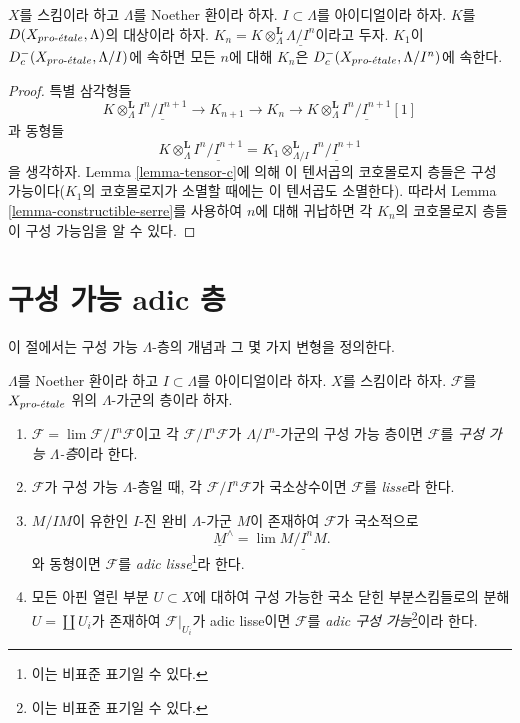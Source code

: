 \begin{lemma}
\label{lemma-compare-truncations-constructible}
$X$를 스킴이라 하고 $\Lambda$를 Noether 환이라 하자.
$I \subset \Lambda$를 아이디얼이라 하자.
$K$를 $D(X_{pro\text{-}\acute{e}tale}, \Lambda)$의 대상이라 하자.
$K_n = K \otimes_\Lambda^\mathbf{L} \underline{\Lambda/I^n}$이라고 두자.
$K_1$이 $D^-_c(X_{pro\text{-}\acute{e}tale}, \Lambda/I)$에 속하면 모든 $n$에 대해
$K_n$은 $D^-_c(X_{pro\text{-}\acute{e}tale}, \Lambda/I^n)$에 속한다.
\end{lemma}

\begin{proof}
특별 삼각형들
$$
K \otimes_\Lambda^\mathbf{L} \underline{I^n/I^{n + 1}} \to
K_{n + 1} \to
K_n \to
K \otimes_\Lambda^\mathbf{L} \underline{I^n/I^{n + 1}}[1]
$$
과 동형들
$$
K \otimes_\Lambda^\mathbf{L} \underline{I^n/I^{n + 1}} =
K_1 \otimes_{\Lambda/I}^\mathbf{L} \underline{I^n/I^{n + 1}}
$$
을 생각하자. Lemma \ref{lemma-tensor-c}에 의해 이 텐서곱의
코호몰로지 층들은 구성 가능이다($K_1$의 코호몰로지가 소멸할 때에는
이 텐서곱도 소멸한다). 따라서 Lemma
\ref{lemma-constructible-serre}를 사용하여 $n$에 대해 귀납하면 각
$K_n$의 코호몰로지 층들이 구성 가능임을 알 수 있다.
\end{proof}








\section{구성 가능 adic 층}
\label{section-adic}

\noindent
이 절에서는 구성 가능 $\Lambda$-층의 개념과 그 몇 가지 변형을
정의한다.

\begin{definition}
\label{definition-adic}
$\Lambda$를 Noether 환이라 하고 $I \subset \Lambda$를 아이디얼이라
하자. $X$를 스킴이라 하자. $\mathcal{F}$를 $X_{pro\text{-}\acute{e}tale}$ 위의
$\Lambda$-가군의 층이라 하자.
\begin{enumerate}
\item $\mathcal{F} = \lim \mathcal{F}/I^n\mathcal{F}$이고 각
$\mathcal{F}/I^n\mathcal{F}$가 $\Lambda/I^n$-가군의 구성 가능
층이면 $\mathcal{F}$를 {\it 구성 가능 $\Lambda$-층}이라 한다.
\item $\mathcal{F}$가 구성 가능 $\Lambda$-층일 때, 각
$\mathcal{F}/I^n\mathcal{F}$가 국소상수이면 $\mathcal{F}$를
{\it lisse}라 한다.
\item $M/IM$이 유한인 $I$-진 완비 $\Lambda$-가군 $M$이 존재하여
$\mathcal{F}$가 국소적으로
$$
\underline{M}^\wedge = \lim \underline{M/I^nM}.
$$
와 동형이면 $\mathcal{F}$를 {\it adic lisse}\footnote{이는 비표준
표기일 수 있다.}라 한다.
\item 모든 아핀 열린 부분 $U \subset X$에 대하여 구성 가능한 국소
닫힌 부분스킴들로의 분해 $U = \coprod U_i$가 존재하여
$\mathcal{F}|_{U_i}$가 adic lisse이면 $\mathcal{F}$를
{\it adic 구성 가능}\footnote{이는 비표준 표기일 수 있다.}이라 한다.
\end{enumerate}
\end{definition}

